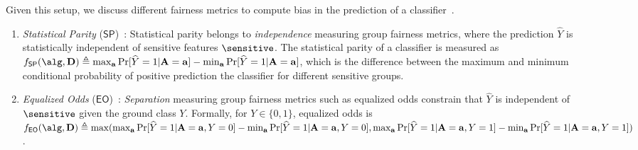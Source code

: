 Given this setup, we discuss different fairness metrics to compute bias in the prediction of a classifier~\cite{feldman2015certifying,hardt2016equality,nabi2018fair}.  %
\begin{enumerate}[leftmargin=*]
	\item \textit{Statistical Parity} ($ \mathsf{SP} $)~\cite{feldman2015certifying}: Statistical parity belongs to \textit{independence} measuring group fairness metrics, where the prediction $ \widehat{Y} $ is statistically independent of sensitive features $ \sensitive $.  The statistical parity of  a classifier is measured as $ f_{\mathsf{SP}}(\alg, \mathbf{D}) \triangleq \max_{\mathbf{a}}\Pr[\widehat{Y} =1 | \mathbf{A} = \mathbf{a}] - \min_{\mathbf{a}}\Pr[\widehat{Y} =1 | \mathbf{A} = \mathbf{a}] $, which is the difference between the maximum and minimum conditional probability of positive prediction the classifier for different sensitive groups.
	
	\item \textit{Equalized Odds} ($ \mathsf{EO} $)~\cite{hardt2016equality}: \textit{Separation} measuring group fairness metrics such as equalized odds constrain that $ \widehat{Y} $ is independent of $ \sensitive $ given the ground class $ Y $.  Formally, for $ Y \in \{0,1\} $, equalized odds is $ f_{\mathsf{EO}}(\alg, \mathbf{D})  \triangleq \max(\max_{\mathbf{a}}\Pr[\widehat{Y} =1 | \mathbf{A} = \mathbf{a}, Y = 0] - \min_{\mathbf{a}}\Pr[\widehat{Y} =1 | \mathbf{A} = \mathbf{a}, Y = 0], \max_{\mathbf{a}}\Pr[\widehat{Y} =1 | \mathbf{A} = \mathbf{a}, Y = 1] - \min_{\mathbf{a}}\Pr[\widehat{Y} =1 | \mathbf{A} = \mathbf{a}, Y = 1])$. 
	

\end{enumerate}
